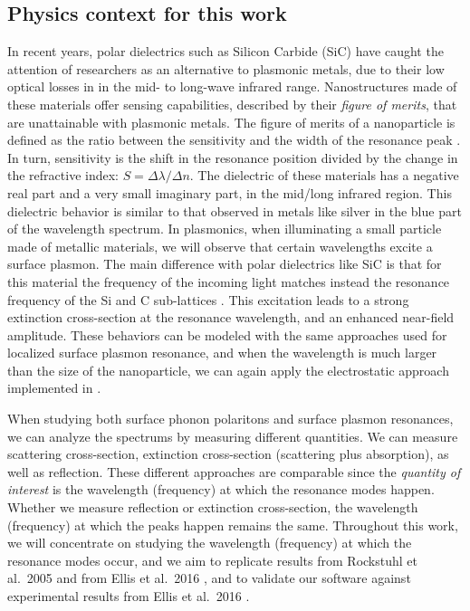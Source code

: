 \subsection{Physics context for this work}

In recent years, polar dielectrics such as Silicon Carbide (SiC) have caught the attention of researchers as an alternative to plasmonic metals, 
due to their low optical losses in in the mid- to long-wave infrared range. 
Nanostructures made of these materials offer sensing capabilities, described by their \emph{figure of merits}, that are unattainable with plasmonic metals. 
The figure of merits of a nanoparticle is defined as the ratio between the sensitivity and the width of the resonance peak \cite{otte-etal-2012}. 
In turn, sensitivity is the shift in the resonance position divided by the change in the refractive index: 
$S = \Delta \lambda / \Delta n$.
The dielectric of these materials has a negative real part and a very small imaginary part, in the mid/long infrared region. 
This dielectric behavior is similar to that observed in metals like silver in the blue part of the wavelength spectrum. 
In plasmonics, when illuminating a small particle made of metallic materials, we will observe that certain wavelengths excite a surface plasmon. 
The main difference with polar dielectrics like SiC is that for this material the frequency of the incoming light matches instead the resonance frequency of the Si and C sub-lattices \cite{caldwell2015,rockstuhl2005}. 
This excitation leads to a strong extinction cross-section at the resonance wavelength, and an enhanced near-field amplitude. 
These behaviors can be modeled with the same approaches used for localized surface plasmon resonance, and when the wavelength is much larger than the size
of the nanoparticle, we can again apply the electrostatic approach implemented in \pygbe \cite{ClementiETal2017, ClementiETal2019}.

When studying both surface phonon polaritons and surface plasmon resonances, we can analyze the spectrums by measuring different quantities. 
We can measure scattering cross-section, extinction cross-section (scattering plus absorption), as well as reflection. 
These different approaches are comparable since the \textit{quantity of interest} is the wavelength (frequency) at which the resonance modes happen. 
Whether we measure reflection or extinction cross-section, the wavelength (frequency) at which the peaks happen remains the same. 
Throughout this work, we will concentrate on studying the wavelength (frequency) at which the resonance modes occur, 
and we aim to replicate results from Rockstuhl et al.\ 2005 \cite{rockstuhl2005} and from Ellis et al.\ 2016 \cite{ellis2016}, 
and to validate our software against experimental results from Ellis et al.\ 2016 \cite{ellis2016}.
